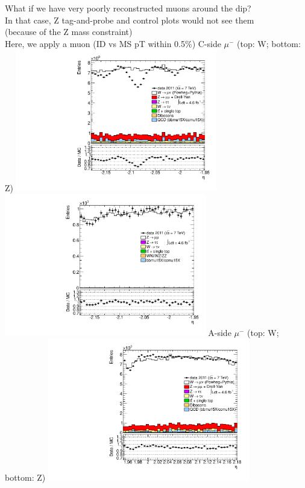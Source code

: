  {
What if we have very poorly reconstructed muons around the dip? \\
In that case, Z tag-and-probe and control plots would not see them \\
(because of the Z mass constraint) \\
Here, we apply a muon  (ID vs MS pT within 0.5\%)
}
 {
\colb[T]
C-side $\mu^{-}$ (top: W; bottom: Z)
\centering
\includegraphics[width=0.66\textwidth]{dates/20130306/figures/etaphi/Widms_10_C_stack_l_eta_NEG} \\
\includegraphics[width=0.66\textwidth]{dates/20130306/figures/etaphi/Zidms_10_C_stack_lN_eta_ALL.pdf}
A-side $\mu^{-}$ (top: W; bottom: Z)
\centering
\includegraphics[width=0.66\textwidth]{dates/20130306/figures/etaphi/Widms_10_A_stack_l_eta_NEG} \\
}
